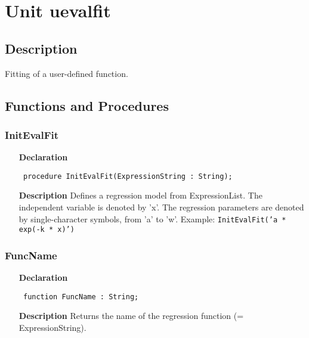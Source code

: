 \documentclass[12pt,a4paper,oneside]{report}
\newcommand{\declarationitem}[1]{\textbf{#1}}
\newcommand{\descriptiontitle}[1]{\textbf{#1}}
\newcommand{\code}[1]{\texttt{#1}}
\begin{document}
\section{Unit uevalfit}
\label{uevalfit}
\subsection{Description}
Fitting of a user{-}defined function. 
\subsection{Functions and Procedures}
\subsubsection{InitEvalFit}
\label{uevalfit-InitEvalFit}
\begin{itemize}\item[\declarationitem{Declaration}\hfill]
	\begin{flushleft}
		\code{
			procedure InitEvalFit(ExpressionString : String);}
		
	\end{flushleft}
	
	\par
	\item[\descriptiontitle{Description}]
	Defines a regression model from ExpressionList. The independent variable is denoted by 'x'. The regression parameters are denoted by single{-}character symbols, from 'a' to 'w'. Example: \code{InitEvalFit('a * exp({-}k * x)')}
	
\end{itemize}
\subsubsection{FuncName}
\label{uevalfit-FuncName}
\begin{itemize}\item[\declarationitem{Declaration}\hfill]
	\begin{flushleft}
		\code{
			function FuncName : String;}
		
	\end{flushleft}
	
	\par
	\item[\descriptiontitle{Description}]
	Returns the name of the regression function (= ExpressionString).
	
\end{itemize}
\end{document}
